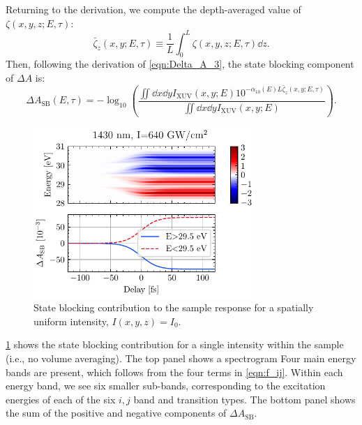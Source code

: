 Returning to the derivation, we compute the depth-averaged value of $\zeta(x,y,z;E,\tau)$:
\begin{equation}
\bar{\zeta}_z(x, y; E, \tau) \equiv \frac{1}{L} \int_{0}^{L} \zeta(x,y,z;E,\tau) \dd{z}.
\label{eqn:zeta_z}
\end{equation}
Then, following the derivation of \cref{eqn:Delta_A_3}, the state blocking component of $\Delta A$ is:
\begin{equation}
\Delta A_{\textrm{SB}} (E, \tau) = -\log_{10} \left( \frac{ \iint \dd{x} \dd{y} I_{\textrm{XUV}}(x,y;E) 10^{- \alpha_{10}(E) L \bar{\zeta}_z(x,y;E,\tau)}}{ \iint \dd{x} \dd{y} I_{\textrm{XUV}}(x,y;E)} \right).
\label{eqn:Delta_A_4}
\end{equation}

\begin{figure}
	\centering
	\includegraphics[width=0.75\textwidth]{figures/chap4/dA_SB_1430nm_640GWcm2.pdf}
	\caption{State blocking contribution to the sample response for a spatially uniform intensity, $I(x,y,z)=I_0$.}
	\label{fig:dA_SB_1430nm_640GWcm2}
\end{figure}

\cref{fig:dA_SB_1430nm_640GWcm2} shows the state blocking contribution for a single intensity within the sample (i.e., no volume averaging). The top panel shows a spectrogram Four main energy bands are present, which follows from the four terms in \cref{eqn:f_ij}. Within each energy band, we see six smaller sub-bands, corresponding to the excitation energies of each of the six $i,j$ band and transition types. The bottom panel shows the sum of the positive and negative components of $\Delta A_{\textrm{SB}}$.

